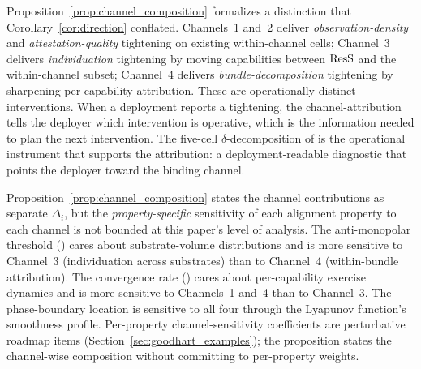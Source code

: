 \begin{remark}
\label{rem:two_sources}
Proposition~\ref{prop:channel_composition} formalizes a distinction
that Corollary~\ref{cor:direction} conflated.  Channels~1 and~2
deliver \emph{observation-density} and \emph{attestation-quality}
tightening on existing within-channel cells; Channel~3 delivers
\emph{individuation} tightening by moving capabilities between
$\mathrm{ResS}$ and the within-channel subset; Channel~4 delivers
\emph{bundle-decomposition} tightening by sharpening per-capability
attribution.  These are operationally distinct interventions.  When
a deployment reports a tightening, the channel-attribution tells
the deployer which intervention is operative, which is the
information needed to plan the next intervention.  The
five-cell $\delta$-decomposition of
\citep[Definition~8]{lasser2026paper8b} is the operational
instrument that supports the attribution: a deployment-readable
diagnostic that points the deployer toward the binding channel.
\end{remark}

\begin{remark}
\label{rem:channel_property_specific}
Proposition~\ref{prop:channel_composition} states the channel
contributions as separate $\Delta_i$, but the
\emph{property-specific} sensitivity of each alignment property to
each channel is not bounded at this paper's level of analysis.
The anti-monopolar threshold (\citep[Proposition~6]{lasser2026horizon})
cares about substrate-volume distributions and is more sensitive
to Channel~3 (individuation across substrates) than to Channel~4
(within-bundle attribution).  The convergence rate
(\citep[Theorem~2]{lasser2026wamura}) cares about per-capability
exercise dynamics and is more sensitive to Channels~1 and~4 than
to Channel~3.  The phase-boundary location is sensitive to all
four through the Lyapunov function's smoothness profile.
Per-property channel-sensitivity coefficients are perturbative
roadmap items (Section~\ref{sec:goodhart_examples}); the
proposition states the channel-wise composition without
committing to per-property weights.
\end{remark}

